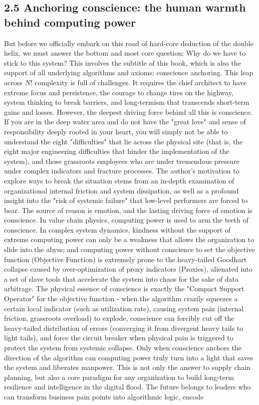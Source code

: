 \documentclass[11pt,a4paper]{article}
\begin{document}
\subsection*{2.5 Anchoring conscience: the human warmth behind computing power}


But before we officially embark on this road of hard-core deduction of the double helix, we must answer the bottom and most core question: Why do we have to stick to this system? This involves the subtitle of this book, which is also the support of all underlying algorithms and axioms: conscience anchoring. This leap across $N!$ complexity is full of challenges. It requires the chief architect to have extreme focus and persistence, the courage to change tires on the highway, system thinking to break barriers, and long-termism that transcends short-term gains and losses. However, the deepest driving force behind all this is conscience. If you are in the deep water area and do not have the "great love" and sense of responsibility deeply rooted in your heart, you will simply not be able to understand the eight "difficulties" that lie across the physical site (that is, the eight major engineering difficulties that hinder the implementation of the system), and those grassroots employees who are under tremendous pressure under complex indicators and fracture processes. The author's motivation to explore ways to break the situation stems from an in-depth examination of organizational internal friction and system dissipation, as well as a profound insight into the "risk of systemic failure" that low-level performers are forced to bear. The source of reason is emotion, and the lasting driving force of emotion is conscience. In value chain physics, computing power is used to arm the teeth of conscience. In complex system dynamics, kindness without the support of extreme computing power can only be a weakness that allows the organization to slide into the abyss; and computing power without conscience to set the objective function (Objective Function) is extremely prone to the heavy-tailed Goodhart collapse caused by over-optimization of proxy indicators (Proxies), alienated into a set of slave tools that accelerate the system into chaos for the sake of data arbitrage. The physical essence of conscience is exactly the "Compact Support Operator" for the objective function - when the algorithm crazily squeezes a certain local indicator (such as utilization rate), causing system pain (internal friction, grassroots overload) to explode, conscience can forcibly cut off the heavy-tailed distribution of errors (converging it from divergent heavy tails to light tails), and force the circuit breaker when physical pain is triggered to protect the system from systemic collapse. Only when conscience anchors the direction of the algorithm can computing power truly turn into a light that saves the system and liberates manpower. This is not only the answer to supply chain planning, but also a core paradigm for any organization to build long-term resilience and intelligence in the digital flood. The future belongs to leaders who can transform business pain points into algorithmic logic, encode 
\end{document}
